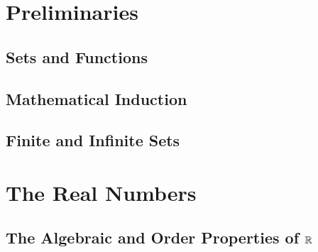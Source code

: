 \documentclass[a4paper,12pt]{article}
\begin{document}
\maketitle
{}
\newpage

\section{Preliminaries}

\subsection{Sets and Functions}


\subsection{Mathematical Induction}


\subsection{Finite and Infinite Sets}

\newpage

\section{The Real Numbers}

\subsection{The Algebraic and Order Properties of \(\mathbb{R}\)}
\end{document}
